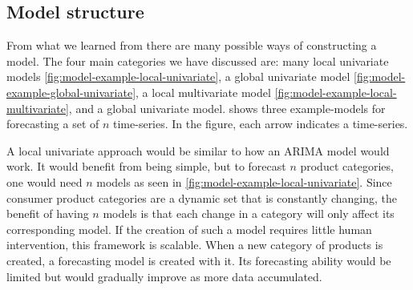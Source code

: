 \subsection{Model structure}

From what we learned from 
there are many possible ways of constructing a model.
The four main categories we have discussed are: many local univariate models \cref{fig:model-example-local-univariate},
a global univariate model \cref{fig:model-example-global-univariate},
a local multivariate model \cref{fig:model-example-local-multivariate}, and a global univariate model.
 shows three example-models for forecasting a set of $n$ time-series.
In the figure, each arrow indicates a time-series.

A local univariate approach would be similar to how an ARIMA model would work.
It would benefit from being simple, but to forecast $n$ product categories,
one would need $n$ models as seen in \cref{fig:model-example-local-univariate}.
Since consumer product categories are a dynamic set that is constantly changing, the benefit of having
$n$ models is that each change in a category will only affect its corresponding model.
If the creation of such a model requires little human intervention, this framework is scalable.
When a new category of products is created, a forecasting model is created with it. Its forecasting ability
would be limited but would gradually improve as more data accumulated.

